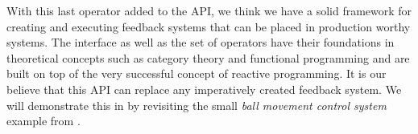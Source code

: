 With this last operator added to the API, we think we have a solid framework for creating and executing feedback systems that can be placed in production worthy systems. The interface as well as the set of operators have their foundations in theoretical concepts such as category theory and functional programming and are built on top of the very successful concept of reactive programming. It is our believe that this API can replace any imperatively created feedback system. We will demonstrate this in  by revisiting the small \textit{ball movement control system} example from .